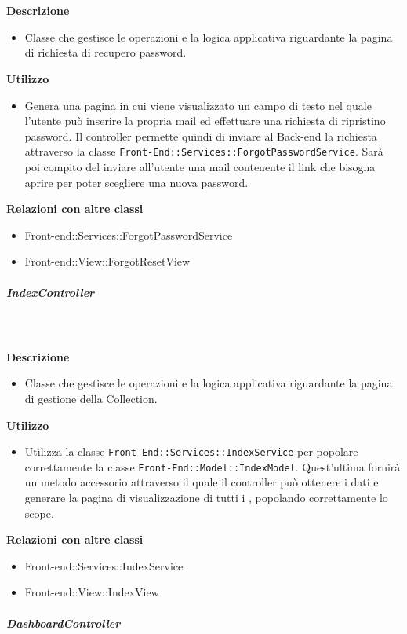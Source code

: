 				\textbf{\\ \\ Descrizione} 
					\begin{itemize}
						\item[] Classe che gestisce le operazioni e la logica applicativa riguardante la pagina di richiesta di recupero password.
					\end{itemize}      
				\textbf{Utilizzo}  
					\begin{itemize}
						\item[] Genera una pagina in cui viene visualizzato un campo di testo nel quale l'utente può inserire la propria mail ed effettuare una richiesta di ripristino password. Il controller permette quindi di inviare al Back-end la richiesta attraverso la classe \texttt{Front-End::Services::ForgotPasswordService}. Sarà poi compito del  inviare all'utente una mail contenente il link che bisogna aprire per poter scegliere una nuova password.
					\end{itemize}
					\textbf{Relazioni con altre classi}
					\begin{itemize}
							\item{Front-end::Services::ForgotPasswordService}
							\item{Front-end::View::ForgotResetView}
					\end{itemize}
			\subparagraph{IndexController}
				
				\textbf{\\ \\ Descrizione} 
					\begin{itemize}
						\item[] Classe che gestisce le operazioni e la logica applicativa riguardante la pagina di gestione della Collection.
					\end{itemize}      
				\textbf{Utilizzo}  
					\begin{itemize}
						\item[] Utilizza la classe \texttt{Front-End::Services::IndexService} per popolare correttamente la classe \texttt{Front-End::Model::IndexModel}. Quest'ultima fornirà un metodo accessorio attraverso il quale il controller può ottenere i dati e generare la pagina di visualizzazione di tutti i , popolando correttamente lo scope.
					\end{itemize}
					\textbf{Relazioni con altre classi}
					\begin{itemize}
							\item{Front-end::Services::IndexService}
							\item{Front-end::View::IndexView}
					\end{itemize}
			\subparagraph{DashboardController}
				
